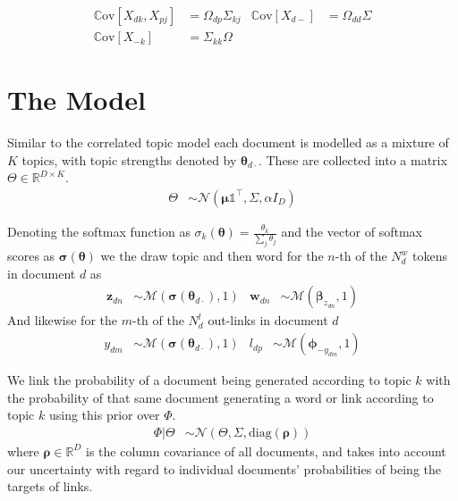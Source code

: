 \documentclass{sciposter}
\newcommand \cov[1] {
    \mathbb{C}\text{ov}[ #1 ]
}
\newcommand \T { ^\top }
\newcommand \vv[1] { \bm #1 }
\newcommand \diag[1] { \text{diag} \left( {#1} \right) }
\newcommand \wdn[0]  { { \vv{w}_{dn} } }
\newcommand \zdn[0]  { { \vv{z}_{dn} } }
\newcommand \mnor[3]  { \mathcal{N} \left(#1, #2, #3\right) }
\newcommand \muln[2]  { \mathcal{M} \left( {#1},{#2} \right) }
\newcommand \beta[1]  { \mathcal{B}eta \left( {#1}, {#2} \right) }
\newcommand \VReal[1] { { \mathbb{R}^{#1} } }
\newcommand \MReal[2] { { \mathbb{R}^{#1 \times #2} } }
\newcommand \one  {{  \mathds{1} }}
\newcommand \thdo { { \vv{\theta}_{d\cdot} } }
\begin{document}
\begin{multicols}{3}
\begin{align*}
\cov{X_{dk}, X_{pj}} & = \Omega_{dp} \Sigma_{kj} &
\cov{X_{d-}} & = \Omega_{dd} \Sigma \\
\cov{X_{-k}} & = \Sigma_{kk} \Omega 
\end{align*}


\newcommand{\imsize}{0.45\columnwidth}
%


\section{The Model}




Similar to the correlated topic model\cite{Blei2006} each document is modelled as a mixture of $K$ topics, with topic strengths denoted by $\thdo$. These are collected into a matrix $\Theta \in \MReal{D}{K}$. 
\begin{align*}
\Theta &\sim \mnor{\vv{\mu}\one\T}{\Sigma}{\alpha I_D}
\end{align*}

Denoting the softmax function as $\sigma_k(\vv{\theta}) = \frac{\theta_k}{\sum_j \theta_j}$ and the vector of softmax scores as $\vv{\sigma}(\vv{\theta})$ we 
the draw topic and then word for the $n$-th of the $N^w_d$ tokens in document $d$ as
\begin{align*}
\zdn & \sim \muln{\vv{\sigma}(\thdo)}{1} &
\wdn & \sim \muln{\vv{\beta}_{z_{dn}}}{1}
\end{align*}
And likewise for the $m$-th of the $N^l_d$ out-links in document $d$
\begin{align*}
y_{dm} & \sim \muln{\vv{\sigma}(\thdo)}{1} &
l_{dp} & \sim \muln{\vv{\phi}_{- y_{dm}}}{1}
\end{align*}

We link the probability of a document being generated according to topic $k$ with the probability of that same document generating a word or link according to topic $k$ using this prior over $\Phi$.
\begin{align*}
\Phi|\Theta & \sim \mnor{\Theta}{\Sigma}{\diag{\vv{\rho}}}
\end{align*}
where $\vv{\rho} \in \VReal{D}$ is the column covariance of all documents, and takes into account our uncertainty with regard to individual documents' probabilities of being the targets of links.



\end{multicols}
\end{document}
